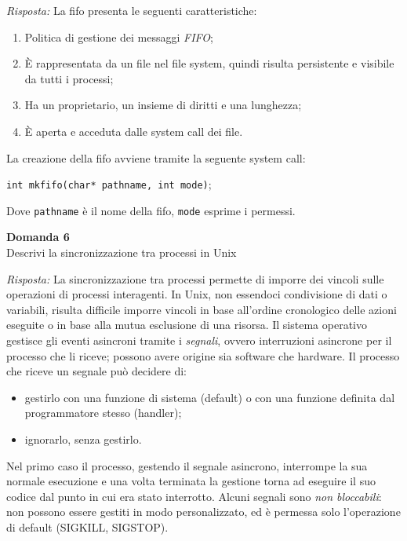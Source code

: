 \documentclass{article}
\newenvironment{problem}[2][Domanda]
    { \begin{mdframed}[backgroundcolor=gray!20] \textbf{#1 #2} \\}
    {  \end{mdframed}}
\newenvironment{solution}
    {\textit{Risposta:}}
    {}
\begin{document}
\begin{solution}
\newpage
La fifo presenta le seguenti caratteristiche:
\begin{enumerate}
    \item Politica di gestione dei messaggi \textit{FIFO};
    \item È rappresentata da un file nel file system, quindi risulta persistente e visibile da tutti i processi;
    \item Ha un proprietario, un insieme di diritti e una lunghezza;
    \item È aperta e acceduta dalle system call dei file.
\end{enumerate}
La creazione della fifo avviene tramite la seguente system call:
\begin{center}
\texttt{int mkfifo(char* pathname, int mode)};
\end{center}
Dove \texttt{pathname} è il nome della fifo, \texttt{mode} esprime i permessi.
\end{solution}
\begin{problem}{6}
Descrivi la sincronizzazione tra processi in Unix 
\end{problem}
\begin{solution}
La sincronizzazione tra processi permette di imporre dei vincoli sulle operazioni di processi interagenti. In Unix, non essendoci condivisione di dati o variabili, risulta difficile imporre vincoli in base all'ordine cronologico delle azioni eseguite o in base alla mutua esclusione di una risorsa.
\newline
\newline
Il sistema operativo gestisce gli eventi asincroni tramite i \textit{segnali}, ovvero interruzioni asincrone per il processo che li riceve; possono avere origine sia software che hardware.
\newline
\newline
Il processo che riceve un segnale può decidere di:
\begin{itemize}
    \item gestirlo con una funzione di sistema (default) o con una funzione definita dal programmatore stesso (handler);
    \item ignorarlo, senza gestirlo.
\end{itemize}
Nel primo caso il processo, gestendo il segnale asincrono, interrompe la sua normale esecuzione e una volta terminata la gestione torna ad eseguire il suo codice dal punto in cui era stato interrotto.
\newline
Alcuni segnali sono \textit{non bloccabili}: non possono essere gestiti in modo personalizzato, ed è permessa solo l’operazione di default (SIGKILL, SIGSTOP).
\end{solution}
\end{document}

